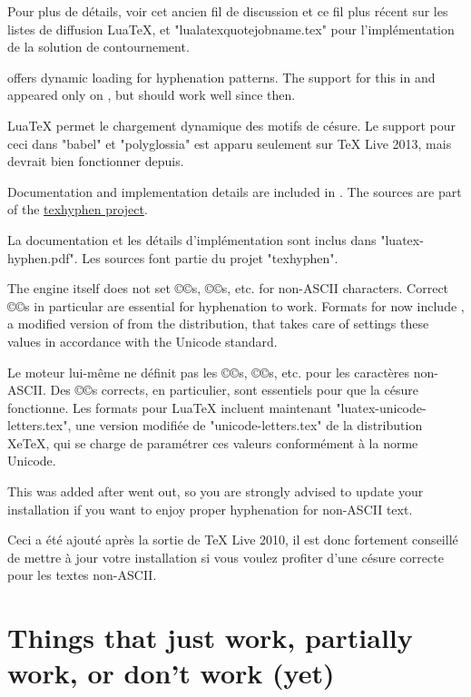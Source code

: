 \documentclass{lltxdoc}
\begin{document}
Pour plus de détails, voir cet ancien fil de discussion et ce fil plus récent sur les listes de diffusion LuaTeX, et "lualatexquotejobname.tex" pour l'implémentation de la solution de contournement.

\luatex offers dynamic loading for hyphenation patterns. The support for this in
 and  appeared only on , but should
work well since then.

LuaTeX permet le chargement dynamique des motifs de césure. Le support pour ceci dans "babel" et "polyglossia" est apparu seulement sur TeX Live 2013, mais devrait bien fonctionner depuis.

Documentation and implementation details are included in
. The sources are part of the
\href{http://tug.org/tex-hyphen/}{texhyphen project}.

La documentation et les détails d'implémentation sont inclus dans "luatex-hyphen.pdf". Les sources font partie du projet "texhyphen".

The engine itself does not set ©\catcode©s, ©\lccode©s, etc. for non-ASCII
characters. Correct ©\lccode©s in particular are essential for hyphenation to
work. Formats for \luatex now include , a
modified version of  from the \xetex distribution,
that takes care of settings these values in accordance with the Unicode
standard.

Le moteur lui-même ne définit pas les ©\catcode©s, ©\lccode©s, etc. pour les caractères non-ASCII. Des ©\lccode©s corrects, en particulier, sont essentiels pour que la césure fonctionne. Les formats pour LuaTeX incluent maintenant "luatex-unicode-letters.tex", une version modifiée de "unicode-letters.tex" de la distribution XeTeX, qui se charge de paramétrer ces valeurs conformément à la norme Unicode.

This was added after  went out, so you are strongly advised to
update your installation if you want to enjoy proper hyphenation for non-ASCII
text.

Ceci a été ajouté après la sortie de TeX Live 2010, il est donc fortement conseillé de mettre à jour votre installation si vous voulez profiter d'une césure correcte pour les textes non-ASCII.


\section{Things that just work, partially work, or don't work (yet)}
\label{workornot}
\end{document}
